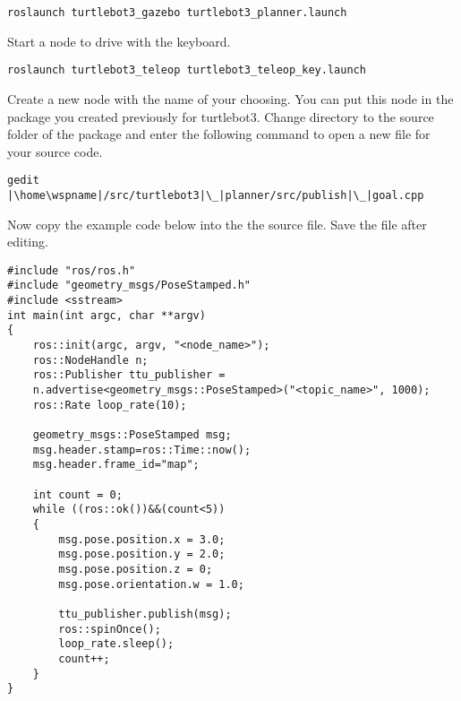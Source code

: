 \documentclass[12pt]{article}
\begin{document}
\begin{description}[labelindent=1cm]
   	\begin{verbatim}
roslaunch turtlebot3_gazebo turtlebot3_planner.launch
	\end{verbatim}
	
	Start a node to drive with the keyboard.
	
	  	\begin{verbatim}
roslaunch turtlebot3_teleop turtlebot3_teleop_key.launch
	\end{verbatim}
   
   
   
   \newpage 
\item[\textbf{\underline{Part 4 - Publish Goal for Turtlebot3 :}}] \hfill \vspace{0mm}   
       
    
    
    \item Create a new node with the name of your choosing. You can put this node in the package you created previously for turtlebot3.  Change directory to the source folder of the package and enter the following command to open a new file for your source code.
\begin{verbatim}
gedit |\home\wspname|/src/turtlebot3|\_|planner/src/publish|\_|goal.cpp
\end{verbatim}

    

    \item Now copy the example code below into the the source file. Save the file after editing. \\
    
        \begin{lstlisting}
#include "ros/ros.h"
#include "geometry_msgs/PoseStamped.h"
#include <sstream>
int main(int argc, char **argv)
{
    ros::init(argc, argv, "<node_name>");
    ros::NodeHandle n;
    ros::Publisher ttu_publisher =
    n.advertise<geometry_msgs::PoseStamped>("<topic_name>", 1000);
    ros::Rate loop_rate(10);

    geometry_msgs::PoseStamped msg;
    msg.header.stamp=ros::Time::now();
    msg.header.frame_id="map";

    int count = 0;
    while ((ros::ok())&&(count<5))  
    {               
        msg.pose.position.x = 3.0;
        msg.pose.position.y = 2.0;
        msg.pose.position.z = 0;
        msg.pose.orientation.w = 1.0;

        ttu_publisher.publish(msg);
        ros::spinOnce();
        loop_rate.sleep();
        count++;
    }
}
\end{lstlisting}
    

\end{description}
\end{document}
